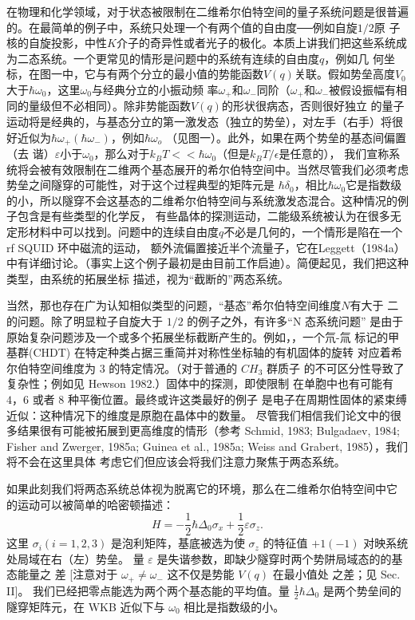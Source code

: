 
在物理和化学领域，对于状态被限制在二维希尔伯特空间的量子系统问题是很普遍的。在最简单的例子中，系统只处理一个有两个值的自由度──例如自旋$1/2$原
子核的自旋投影，中性$K$介子的奇异性或者光子的极化。本质上讲我们把这些系统成为二态系统。一个更常见的情形是问题中的系统有连续的自由度$q$，例如几
何坐标，在图一中，它与有两个分立的最小值的势能函数$V(q)$关联。假如势垒高度$V_0$大于$\hbar\omega_0$，这里$\omega_0$与经典分立的小振动频
率$\omega_{+}$和$\omega_{-}$同阶（$\omega_{+}$和$\omega_{-}$被假设振幅有相同的量级但不必相同）。除非势能函数$V(q)$的形状很病态，否则很好独立
的量子运动将是经典的，与基态分立的第一激发态（独立的势垒），对左手（右手）将很好近似为$\hbar\omega_{+}(\hbar\omega_{-})$，例如$\hbar\omega_{o}$
（见图一）。此外，如果在两个势垒的基态间偏置（去 谐）$\varepsilon$小于$\omega_0$，那么对于$k_BT<<\hbar\omega_0$（但是$k_BT/\epsilon$是任意的），
我们宣称系统将会被有效限制在二维两个基态展开的希尔伯特空间中。当然尽管我们必须考虑势垒之间隧穿的可能性，对于这个过程典型的矩阵元是
$\hbar\delta_0$，相比$\hbar\omega_0$它是指数级的小，所以隧穿不会这基态的二维希尔伯特空间与系统激发态混合。这种情况的例子包含是有些类型的化学反，
有些晶体的探测运动，二能级系统被认为在很多无定形材料中可以找到。问题中的连续自由度$q$不必是几何的，一个情形是陷在一个 rf SQUID 环中磁流的运动，
额外流偏置接近半个流量子，它在Leggett（1984a）中有详细讨论。（事实上这个例子最初是由目前工作启迪）。简便起见，我们把这种类型，由系统的拓展坐标
描述，视为“截断的”两态系统。

当然，那也存在广为认知相似类型的问题，“基态”希尔伯特空间维度$N$有大于 二的问题。除了明显粒子自旋大于 $1/2$ 的例子之外，有许多“N 态系统问题”
是由于原始复杂问题涉及一个或多个拓展坐标截断产生的。例如，，一个氘-氚 标记的甲基群(CHDT) 在特定种类占据三重简并对称性坐标轴的有机固体的旋转
对应着希尔伯特空间维度为 $3$ 的特定情况。（对于普通的 $CH_{3}$ 群质子 的不可区分性导致了复杂性；例如见 Hewson 1982.）固体中的探测，即使限制
在单胞中也有可能有 $4，6$ 或者 $8$ 种平衡位置。最终或许这类最好的例子 是电子在周期性固体的紧束缚近似：这种情况下的维度是原胞在晶体中的数量。
尽管我们相信我们论文中的很多结果很有可能被拓展到更高维度的情形（参考 Schmid, 1983; Bulgadaev, 1984; Fisher and Zwerger, 1985a;
Guinea et al., 1985a; Weiss and Grabert, 1985），我们将不会在这里具体 考虑它们但应该会将我们注意力聚焦于两态系统。


如果此刻我们将两态系统总体视为脱离它的环境，那么在二维希尔伯特空间中它 的运动可以被简单的哈密顿描述：
\begin{equation}
  \label{eq:1}
  H=- \frac{1}{2}\hbar\Delta_{0}\sigma_{x}+ \frac{1}{2}\varepsilon\sigma_{z}.
\end{equation}
这里 $\sigma_{i}\left(i=1,2,3\right)$ 是泡利矩阵，基底被选为使 $\sigma_{z}$ 的特征值 $+1\left(-1\right)$ 对映系统处局域在右（左）势垒。
量 $\varepsilon$ 是失谐参数，即缺少隧穿时两个势阱局域态的的基态能量之 差 [注意对于 $\omega_{+}\neq\omega_{-}$ 这不仅是势能 $V(q)$ 在最小值处
之差；见 Sec. II]。 我们已经把零点能选为两个两个基态能的平均值。量 $ \frac{1}{2}\hbar\Delta_{0} $ 是两个势垒间的隧穿矩阵元，在 WKB 近似下与
$\omega_{0}$ 相比是指数级的小。

